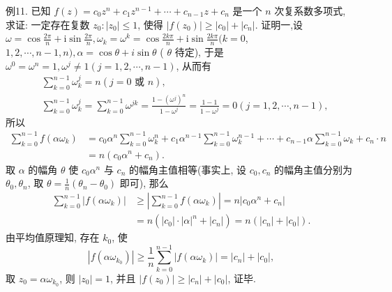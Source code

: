例11. 已知 $f(z)=c_0 z^n+c_1 z^{n-1}+\cdots+c_{n-1} z+c_n$ 是一个 $n$ 次复系数多项式, 求证: 一定存在复数 $z_0:\left|z_0\right| \leqslant 1$, 使得 $\left|f\left(z_0\right)\right| \geqslant\left|c_0\right|+\left|c_n\right|$. 
证明一,设 $\omega=\cos \frac{2 \pi}{n}+\mathrm{i} \sin \frac{2 \pi}{n}, \omega_k=\omega^k=\cos \frac{2 k \pi}{n}+\mathrm{i} \sin \frac{2 k \pi}{n}(k=0$, $1,2, \cdots, n-1, n), \alpha=\cos \theta+i \sin \theta$ ( $\theta$ 待定), 于是 $\omega^0=\omega^n=1, \omega^j \neq 1(j=1,2, \cdots, n-1)$, 从而有
$$
\begin{aligned}
& \sum_{k=0}^{n-1} \omega_k^j=n(j=0 \text { 或 } n), \\
& \sum_{k=0}^{n-1} \omega_k^j=\sum_{k=0}^{n-1} \omega^{j k}=\frac{1-\left(\omega^j\right)^n}{1-\omega^j}=\frac{1-1}{1-\omega^j}=0(j=1,2, \cdots, n-1),
\end{aligned}
$$
所以
$$
\begin{aligned}
\sum_{k=0}^{n-1} f\left(\alpha \omega_k\right) & =c_0 \alpha^n \sum_{k=0}^{n-1} \omega_k^n+c_1 \alpha^{n-1} \sum_{k=0}^{n-1} \omega_k^{n-1}+\cdots+c_{n-1} \alpha \sum_{k=0}^{n-1} \omega_k+c_n \cdot n \\
& =n\left(c_0 \alpha^n+c_n\right) .
\end{aligned}
$$
取 $\alpha$ 的幅角 $\theta$ 使 $c_0 \alpha^n$ 与 $c_n$ 的幅角主值相等(事实上, 设 $c_0, c_n$ 的幅角主值分别为 $\theta_0, \theta_n$, 取 $\theta=\frac{1}{n}\left(\theta_n-\theta_0\right)$ 即可), 那么
$$
\begin{aligned}
\sum_{k=0}^{n-1}\left|f\left(\alpha \omega_k\right)\right| & \geqslant\left|\sum_{k=0}^{n-1} f\left(\alpha \omega_k\right)\right|=n\left|c_0 \alpha^n+c_n\right| \\
& =n\left(\left|c_0\right| \cdot|\alpha|^n+\left|c_n\right|\right)=n\left(\left|c_n\right|+\left|c_0\right|\right) .
\end{aligned}
$$
由平均值原理知, 存在 $k_0$, 使
$$
\left|f\left(\alpha \omega_{k_0}\right)\right| \geqslant \frac{1}{n} \sum_{k=0}^{n-1}\left|f\left(\alpha \omega_k\right)\right|=\left|c_n\right|+\left|c_0\right|,
$$
取 $z_0=\alpha \omega_{k_0}$, 则 $\left|z_0\right|=1$, 并且 $\left|f\left(z_0\right)\right| \geqslant\left|c_n\right|+\left|c_0\right|$, 证毕.



